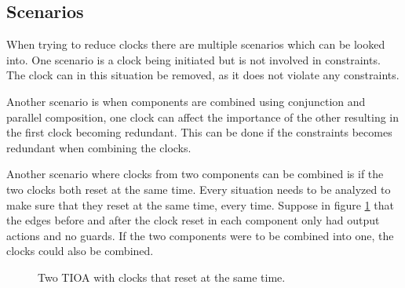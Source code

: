 \subsection{Scenarios} \label{scenarios}
When trying to reduce clocks there are multiple scenarios which can be looked into. One scenario is a clock being initiated but is not involved in constraints. The clock can in this situation be removed, as it does not violate any constraints. 

Another scenario is when components are combined using conjunction and parallel composition, one clock can affect the importance of the other resulting in the first clock becoming redundant. This can be done if the constraints becomes redundant when combining the clocks.

Another scenario where clocks from two components can be combined is if the two clocks both reset at the same time. Every situation needs to be analyzed to make sure that they reset at the same time, every time. Suppose in figure \ref{fig:tioa-scenario1} that the edges before and after the clock reset in each component only had output actions and no guards. If the two components were to be combined into one, the clocks could also be combined.  %


\begin{figure}[H]
    \centering
    \caption{Two TIOA with clocks that reset at the same time.}
    \label{fig:tioa-scenario1}
\end{figure}


